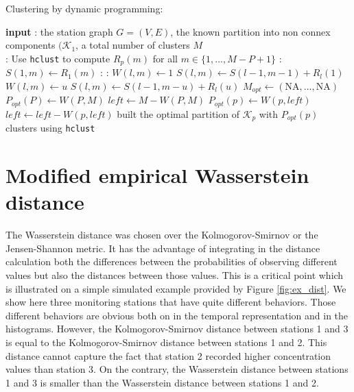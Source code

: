\begin{appendices}
\begin{algorithm}[ht]
\begin{algorithmic}
\end{algorithmic}
\end{algorithm} 

\begin{algorithm}[ht]
\caption{Clustering by dynamic programming:}\label{algo:dyn}
\begin{algorithmic}

\State \textbf{input} : the station graph $G=(V,E)$, the known partition into non connex components $(\mathcal{K_1}$, a total number of clusters $M$ \\
    
  : 
 \State Use \texttt{hclust} to compute $R_p(m)$ for all $m \in \{1,\dots,M-P+1\}$
 \EndFor 
  : 
 \State $S(1,m) \gets R_1(m)$ 
 \EndFor 
  : 
   : 
     \State $W(l,m) \gets 1$ 
     \State $S(l,m) \gets S(l-1,m-1)+R_l(1)$
     \State $W(l,m) \gets u$
     \State $S(l,m) \gets S(l-1,m-u)+R_l(u)$
   \EndIf
   \EndFor
 \EndFor 
 \EndFor 
 \State $M_{opt} \gets (\text{NA},\dots,\text{NA})$
 \State $P_{opt}(P) \gets W(P,M)$
 \State $\textit{left} \gets M-W(P,M)$
 \State $P_{opt}(p) \gets W(p,\textit{left})$
 \State $\textit{left} \gets \textit{left}-W(p,\textit{left})$
 \EndFor
 \State built the optimal partition of $\mathcal{K}_p$ with $P_{opt}(p)$ clusters using \texttt{hclust}
 \EndFor 
\end{algorithmic}
\end{algorithm} 

\clearpage

\section{Modified empirical Wasserstein distance}\label{appendix:wasserstein}

The Wasserstein distance was chosen over the Kolmogorov-Smirnov or the Jensen-Shannon metric. It has the advantage of integrating in the distance calculation both the differences between the probabilities of observing different values but also the distances between those values. This is a critical point which is illustrated on a simple simulated example provided by Figure \ref{fig:ex_dist}. We show here three monitoring stations that have quite different behaviors. Those different behaviors are obvious both on in the temporal representation and in the histograms. However, the Kolmogorov-Smirnov distance between stations 1 and 3 is equal to the Kolmogorov-Smirnov distance between stations 1 and 2. This distance cannot capture the fact that station 2 recorded higher concentration values than station 3. On the contrary, the Wasserstein distance between stations 1 and 3 is smaller than the Wasserstein distance between stations 1 and 2. 


\end{appendices}
